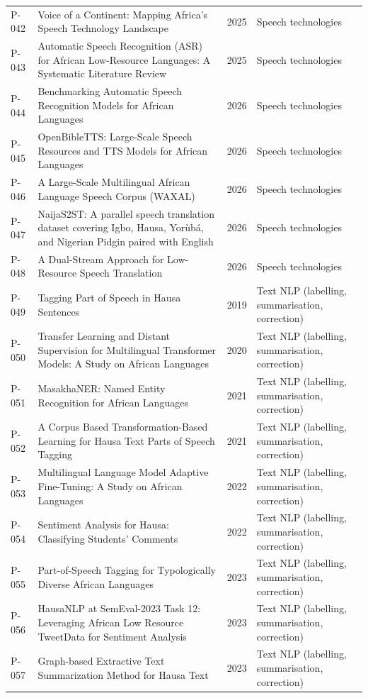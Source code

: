 \begin{longtable}{@{}p{} p{} p{} p{}@{}}
P-042 & Voice of a Continent: Mapping Africa's Speech Technology Landscape & 2025 & Speech technologies \\
P-043 & Automatic Speech Recognition (ASR) for African Low-Resource Languages: A Systematic Literature Review & 2025 & Speech technologies \\
P-044 & Benchmarking Automatic Speech Recognition Models for African Languages & 2026 & Speech technologies \\
P-045 & OpenBibleTTS: Large-Scale Speech Resources and TTS Models for African Languages & 2026 & Speech technologies \\
P-046 & A Large-Scale Multilingual African Language Speech Corpus (WAXAL) & 2026 & Speech technologies \\
P-047 & NaijaS2ST: A parallel speech translation dataset covering Igbo, Hausa, Yor\`{u}b\'{a}, and Nigerian Pidgin paired with English & 2026 & Speech technologies \\
P-048 & A Dual-Stream Approach for Low-Resource Speech Translation & 2026 & Speech technologies \\
P-049 & Tagging Part of Speech in Hausa Sentences & 2019 & Text NLP (labelling, summarisation, correction) \\
P-050 & Transfer Learning and Distant Supervision for Multilingual Transformer Models: A Study on African Languages & 2020 & Text NLP (labelling, summarisation, correction) \\
P-051 & MasakhaNER: Named Entity Recognition for African Languages & 2021 & Text NLP (labelling, summarisation, correction) \\
P-052 & A Corpus Based Transformation-Based Learning for Hausa Text Parts of Speech Tagging & 2021 & Text NLP (labelling, summarisation, correction) \\
P-053 & Multilingual Language Model Adaptive Fine-Tuning: A Study on African Languages & 2022 & Text NLP (labelling, summarisation, correction) \\
P-054 & Sentiment Analysis for Hausa: Classifying Students' Comments & 2022 & Text NLP (labelling, summarisation, correction) \\
P-055 & Part-of-Speech Tagging for Typologically Diverse African Languages & 2023 & Text NLP (labelling, summarisation, correction) \\
P-056 & HausaNLP at SemEval-2023 Task 12: Leveraging African Low Resource TweetData for Sentiment Analysis & 2023 & Text NLP (labelling, summarisation, correction) \\
P-057 & Graph-based Extractive Text Summarization Method for Hausa Text & 2023 & Text NLP (labelling, summarisation, correction) \\

\end{longtable}
